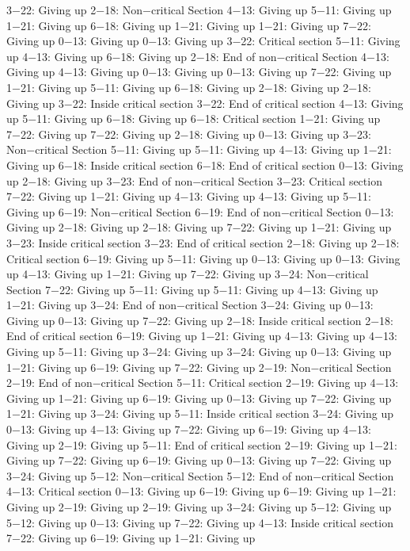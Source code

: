 3−22: Giving up
2−18: Non−critical Section
4−13: Giving up
5−11: Giving up
1−21: Giving up
6−18: Giving up
1−21: Giving up
1−21: Giving up
7−22: Giving up
0−13: Giving up
0−13: Giving up
3−22: Critical section
5−11: Giving up
4−13: Giving up
6−18: Giving up
2−18: End of non−critical Section
4−13: Giving up
4−13: Giving up
0−13: Giving up
0−13: Giving up
7−22: Giving up
1−21: Giving up
5−11: Giving up
6−18: Giving up
2−18: Giving up
2−18: Giving up
3−22: Inside critical section
3−22: End of critical section
4−13: Giving up
5−11: Giving up
6−18: Giving up
6−18: Critical section
1−21: Giving up
7−22: Giving up
7−22: Giving up
2−18: Giving up
0−13: Giving up
3−23: Non−critical Section
5−11: Giving up
5−11: Giving up
4−13: Giving up
1−21: Giving up
6−18: Inside critical section
6−18: End of critical section
0−13: Giving up
2−18: Giving up
3−23: End of non−critical Section
3−23: Critical section
7−22: Giving up
1−21: Giving up
4−13: Giving up
4−13: Giving up
5−11: Giving up
6−19: Non−critical Section
6−19: End of non−critical Section
0−13: Giving up
2−18: Giving up
2−18: Giving up
7−22: Giving up
1−21: Giving up
3−23: Inside critical section
3−23: End of critical section
2−18: Giving up
2−18: Critical section
6−19: Giving up
5−11: Giving up
0−13: Giving up
0−13: Giving up
4−13: Giving up
1−21: Giving up
7−22: Giving up
3−24: Non−critical Section
7−22: Giving up
5−11: Giving up
5−11: Giving up
4−13: Giving up
1−21: Giving up
3−24: End of non−critical Section
3−24: Giving up
0−13: Giving up
0−13: Giving up
7−22: Giving up
2−18: Inside critical section
2−18: End of critical section
6−19: Giving up
1−21: Giving up
4−13: Giving up
4−13: Giving up
5−11: Giving up
3−24: Giving up
3−24: Giving up
0−13: Giving up
1−21: Giving up
6−19: Giving up
7−22: Giving up
2−19: Non−critical Section
2−19: End of non−critical Section
5−11: Critical section
2−19: Giving up
4−13: Giving up
1−21: Giving up
6−19: Giving up
0−13: Giving up
7−22: Giving up
1−21: Giving up
3−24: Giving up
5−11: Inside critical section
3−24: Giving up
0−13: Giving up
4−13: Giving up
7−22: Giving up
6−19: Giving up
4−13: Giving up
2−19: Giving up
5−11: End of critical section
2−19: Giving up
1−21: Giving up
7−22: Giving up
6−19: Giving up
0−13: Giving up
7−22: Giving up
3−24: Giving up
5−12: Non−critical Section
5−12: End of non−critical Section
4−13: Critical section
0−13: Giving up
6−19: Giving up
6−19: Giving up
1−21: Giving up
2−19: Giving up
2−19: Giving up
3−24: Giving up
5−12: Giving up
5−12: Giving up
0−13: Giving up
7−22: Giving up
4−13: Inside critical section
7−22: Giving up
6−19: Giving up
1−21: Giving up
